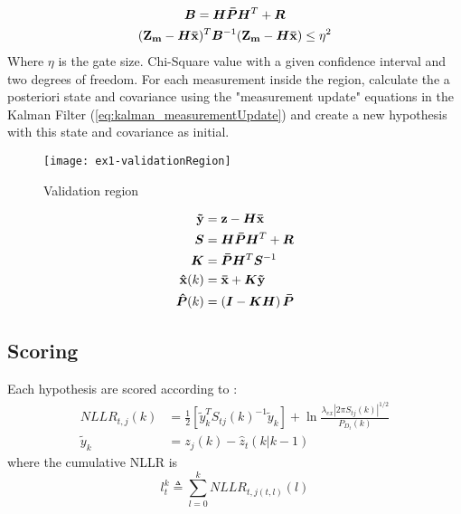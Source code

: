 \begin{gather*}
\bm{B}	= \bm{H} \bm{\bar{P}} \bm{H}^T + \bm{R} \\
(\boldsymbol{\mathbf{Z_m}} - \bm{H}\boldsymbol{\mathbf{\bar{x}}})^T	\bm{B}^{-1} (\boldsymbol{\mathbf{Z_m}} - \bm{H}\boldsymbol{\mathbf{\bar{x}}}) \leq \eta^2
\end{gather*}
Where $\eta$ is the gate size.  Chi-Square value with a given confidence interval and two degrees of freedom. For each measurement inside the region, calculate the a posteriori state and covariance using the "measurement update" equations in the Kalman Filter (\ref{eq:kalman_measurementUpdate}) and create a new hypothesis with this state and covariance as initial.

\begin{figure}[h]
\centering
\texttt{[image: ex1-validationRegion]}
\caption{Validation region}
\label{fig:validation_region}
\end{figure}

\begin{equation}
\begin{split}
\boldsymbol{\mathbf{\tilde{y}}}	&= \boldsymbol{\mathbf{z}} - \bm{H} \boldsymbol{\mathbf{\bar{x}}} \\
\bm{S}			&= \bm{H} \bm{\bar{P}} \bm{H}^T + \bm{R} \\
\bm{K} 			&= \bm{\bar{P}} \bm{H}^T \bm{S}^{-1} \\
\boldsymbol{\mathbf{\hat{x}}}(k) 	&= \boldsymbol{\mathbf{\bar{x}}} + \bm{K} \boldsymbol{\mathbf{\tilde{y}}} \\
\bm{\hat{P}}(k) 	&= \left( \bm{I} - \bm{K} \bm{H} \right) \bm{\bar{P}}
\end{split}
\label{eq:kalman_measurementUpdate}
\end{equation}

\subsection{Scoring}
Each hypothesis are scored according to \cite{Bar-Shalom2007}:
\begin{equation}
\begin{split}
NLLR_{t,j}(k) &= \frac{1}{2} \left[ \tilde{y}_k^T S_{tj}(k)^{-1} \tilde{y}_k \right] + \ln \frac{\lambda_{ex} |2 \pi S_{tj}(k)|^{1/2}}{P_{D_t}(k)} \\				
\tilde{y}_k &= z_j(k)-\hat{z}_t(k|k-1)
\end{split}
\end{equation}
where the cumulative NLLR is
\begin{equation}
l_t^k \triangleq \sum_{l=0}^k NLLR_{t,j(t,l)}(l)
\end{equation}

